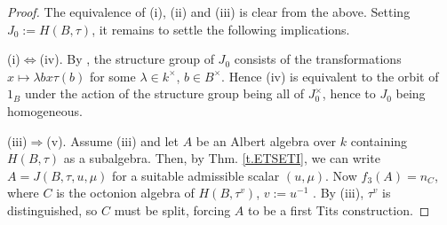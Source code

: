 \documentclass{amsart}
\theoremstyle{definition} %
\theoremstyle{remark} %
\renewcommand{\:}{\colon\,}
\numberwithin{equation}{section}
\begin{document}
\begin{proof} The equivalence of (i), (ii) and (iii) is clear from the above. Setting $J_0 := H(B,\tau)$, it remains to settle the following implications. 

(i)$\Leftrightarrow$(iv). By \cite[Thms.~6,7]{MR407103}, the structure group of $J_0$ consists of the transformations $x \mapsto \lambda bx\tau(b)$ for some $\lambda \in k^\times$, $b \in B^\times$. Hence (iv) is equivalent to the orbit of $1_B$ under the action of the structure group being all of $J_0^\times$, hence to $J_0$ being homogeneous.

(iii)$\Rightarrow$(v). Assume (iii) and let $A$ be an Albert algebra over $k$ containing $H(B,\tau)$ as a subalgebra. Then, by Thm. \ref{t.ETSETI}, we can write $A=J(B,\tau, u, \mu)$ for a suitable admissible scalar $(u,\mu)$. Now $f_3(A)=n_C$, where $C$ is the octonion algebra of $H(B,\tau^v)$, $v := u^{-1}$ \cite[Thm.~1.8]{MR1337184}. %
By (iii), $\tau^v$ is distinguished, so $C$ must be split, forcing $A$ to be a first Tits construction.



\end{proof}
\end{document}

